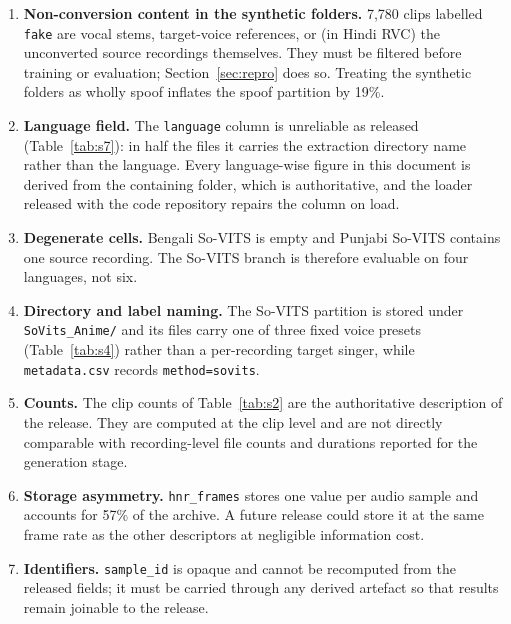 \documentclass[conference]{IEEEtran}
\begin{document}
\begin{enumerate}
  \item \textbf{Non-conversion content in the synthetic folders.} 7{,}780 clips labelled
        \texttt{fake} are vocal stems, target-voice references, or (in Hindi RVC) the
        unconverted source recordings themselves. They must be filtered before training
        or evaluation; Section~\ref{sec:repro} does so. Treating the synthetic folders as
        wholly spoof inflates the spoof partition by 19\%.
  \item \textbf{Language field.} The \texttt{language} column is unreliable as released
        (Table~\ref{tab:s7}): in half the files it carries the extraction directory name
        rather than the language. Every language-wise figure in this document is derived
        from the containing folder, which is authoritative, and the loader released with the
        code repository repairs the column on load.
  \item \textbf{Degenerate cells.} Bengali So-VITS is empty and Punjabi So-VITS contains
        one source recording. The So-VITS branch is therefore evaluable on four languages,
        not six.
  \item \textbf{Directory and label naming.} The So-VITS partition is stored under
        \texttt{SoVits\_Anime/} and its files carry one of three fixed voice presets
        (Table~\ref{tab:s4}) rather than a per-recording target singer, while
        \texttt{metadata.csv} records \texttt{method=sovits}.
  \item \textbf{Counts.} The clip counts of Table~\ref{tab:s2} are the authoritative
        description of the release. They are computed at the clip level and are not
        directly comparable with recording-level file counts and durations reported for
        the generation stage.
  \item \textbf{Storage asymmetry.} \texttt{hnr\_frames} stores one value per audio sample
        and accounts for 57\% of the archive. A future release could store it at the same
        frame rate as the other descriptors at negligible information cost.
  \item \textbf{Identifiers.} \texttt{sample\_id} is opaque and cannot be recomputed from
        the released fields; it must be carried through any derived artefact so that
        results remain joinable to the release.
\end{enumerate}
\end{document}
